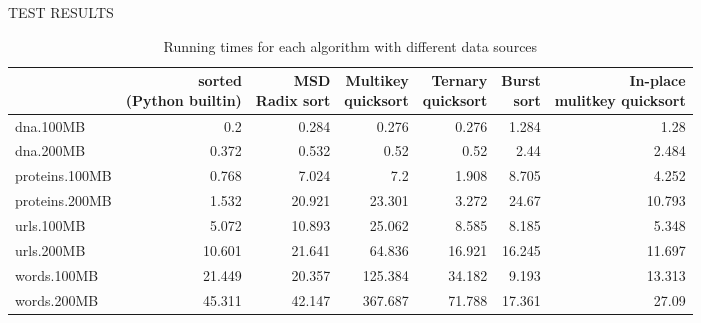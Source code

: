 \sffamily\normalsize{\color{sciorange}TEST RESULTS}\small\\
\footnotesize 
\begin{table}
   \begin{tabular}{| l | r | r | r | r | r | r |}
        \hline
 & \specialcell{sorted \\(Python builtin)}& \specialcell{MSD \\Radix sort} & \specialcell{Multikey\\ quicksort}&\specialcell{Ternary \\quicksort} & \specialcell{Burst \\ sort}  &  \specialcell{In-place \\ mulitkey quicksort}\\ \hline 
dna.100MB&   0.2& 0.284&   0.276&   0.276&   1.284&   1.28\\
dna.200MB&   0.372&   0.532&   0.52&    0.52&    2.44&    2.484\\
proteins.100MB&  0.768&   7.024&   7.2& 1.908&   8.705&   4.252\\
proteins.200MB&  1.532&   20.921&  23.301&  3.272&   24.67&   10.793\\
urls.100MB&  5.072&   10.893&  25.062&  8.585&   8.185&   5.348\\
urls.200MB&  10.601&  21.641&  64.836&  16.921&  16.245&  11.697\\
words.100MB& 21.449&  20.357&  125.384& 34.182&  9.193&   13.313\\
words.200MB& 45.311&  42.147&  367.687& 71.788&  17.361&  27.09\\
        \hline
  \end{tabular}
\caption{Running times for each algorithm with different data sources}
\label{dataset}
\end{table}

